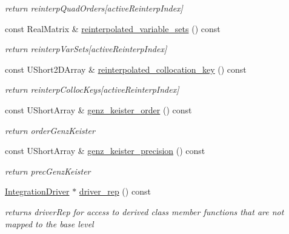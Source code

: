 \begin{DoxyCompactItemize}
\begin{DoxyCompactList}\small\item\em return reinterp\+Quad\+Orders\mbox{[}active\+Reinterp\+Index\mbox{]} \end{DoxyCompactList}\item 
const Real\+Matrix \& \hyperlink{classPecos_1_1IntegrationDriver_a98b3df639857ab489a9368760c15fe25}{reinterpolated\+\_\+variable\+\_\+sets} () const \label{classPecos_1_1IntegrationDriver_a98b3df639857ab489a9368760c15fe25}

\begin{DoxyCompactList}\small\item\em return reinterp\+Var\+Sets\mbox{[}active\+Reinterp\+Index\mbox{]} \end{DoxyCompactList}\item 
const U\+Short2\+D\+Array \& \hyperlink{classPecos_1_1IntegrationDriver_a51c0d1f979921e35e728aa5cde714d47}{reinterpolated\+\_\+collocation\+\_\+key} () const \label{classPecos_1_1IntegrationDriver_a51c0d1f979921e35e728aa5cde714d47}

\begin{DoxyCompactList}\small\item\em return reinterp\+Colloc\+Keys\mbox{[}active\+Reinterp\+Index\mbox{]} \end{DoxyCompactList}\item 
const U\+Short\+Array \& \hyperlink{classPecos_1_1IntegrationDriver_ae6d9d2cb5478b07205eec17c930f5b87}{genz\+\_\+keister\+\_\+order} () const \label{classPecos_1_1IntegrationDriver_ae6d9d2cb5478b07205eec17c930f5b87}

\begin{DoxyCompactList}\small\item\em return order\+Genz\+Keister \end{DoxyCompactList}\item 
const U\+Short\+Array \& \hyperlink{classPecos_1_1IntegrationDriver_a6eef375289da64304c6118582899f8a4}{genz\+\_\+keister\+\_\+precision} () const \label{classPecos_1_1IntegrationDriver_a6eef375289da64304c6118582899f8a4}

\begin{DoxyCompactList}\small\item\em return prec\+Genz\+Keister \end{DoxyCompactList}\item 
\hyperlink{classPecos_1_1IntegrationDriver}{Integration\+Driver} $\ast$ \hyperlink{classPecos_1_1IntegrationDriver_ad9ffab47d51875c80dc41a1ec9980649}{driver\+\_\+rep} () const \label{classPecos_1_1IntegrationDriver_ad9ffab47d51875c80dc41a1ec9980649}

\begin{DoxyCompactList}\small\item\em returns driver\+Rep for access to derived class member functions that are not mapped to the base level \end{DoxyCompactList}\end{DoxyCompactItemize}
